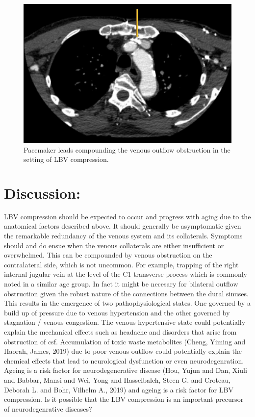 \documentclass{article}
\begin{document}
\begin{figure}[htbp]
\centering
\includegraphics[width=.9\linewidth]{./images/LBVpacemakerleads.jpg}
\caption{Pacemaker leads compounding the venous outflow obstruction in the setting of LBV compression.}
\end{figure}

\section*{Discussion:}
\label{sec:org3f19735}
LBV compression should be expected to occur and progress with aging due to the anatomical factors described above.
It should generally be asymptomatic given the remarkable redundancy of the venous system and its collaterals.
Symptoms should and do ensue when the venous collaterals are either insufficient or overwhelmed.
This can be compounded by venous obstruction on the contralateral side, which is not uncommon.
For example, trapping of the right internal jugular vein at the level of the C1 transverse process which is commonly noted in a similar age group.
In fact it might be necesary for bilateral outflow obstruction given the robust nature of the connections between the dural sinuses.
This results in the emergence of two pathophysiological states.
One governed by a build up of pressure due to venous hypertension and the other governed by stagnation / venous congestion.
The venous hypertensive state could potentially explain the mechanical effects such as headache and disorders that arise from obstruction of csf.
Accumulation of toxic waste metabolites (Cheng, Yiming and Haorah, James, 2019) due to poor venous outflow could potentially explain the chemical effects that lead to neurological dysfunction or even neurodegenration.
Ageing is a risk factor for neurodegenerative disease (Hou, Yujun and Dan, Xiuli and Babbar, Mansi and Wei, Yong and Hasselbalch, Steen G. and Croteau, Deborah L. and Bohr, Vilhelm A., 2019) and ageing is a risk factor for LBV compression.
Is it possible that the LBV compression is an important precursor of neurodegenrative diseases?
\end{document}
